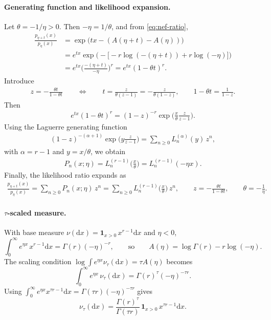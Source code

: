 \documentclass[a4paper,11pt]{article}
\numberwithin{equation}{section}
\theoremstyle{plain}
\theoremstyle{definition}
\theoremstyle{remark}
\newcommand{\1}{\ensuremath{\mathds{1}}\xspace}
\newcommand{\dd}{\ensuremath{{\textrm{d}}}\xspace}
\begin{document}
\paragraph{Generating function and likelihood expansion.}
Let \(\theta=-1/\eta>0\). Then \(-\eta=1/\theta\), and from \eqref{eq:nef-ratio},
\begin{align}
\frac{p_{\eta+t}(x)}{p_\eta(x)}
&=\exp\!\big(t x-(A(\eta+t)-A(\eta))\big)\nonumber\\
&=e^{t x}\exp\!\Big(-\big[-r\log(-(\eta+t))+r\log(-\eta)\big]\Big)\nonumber\\
&=e^{t x}\Big(\frac{-(\eta+t)}{-\eta}\Big)^r
=e^{t x}(1-\theta t)^r .
\end{align}
Introduce
\begin{align}
z=-\frac{\theta t}{1-\theta t}
\qquad\Longleftrightarrow\qquad
t=\frac{z}{\theta(z-1)}=-\frac{z}{\theta(1-z)},
\qquad
1-\theta t=\frac{1}{1-z}.
\end{align}
Then
\begin{align}
e^{t x}(1-\theta t)^r
=(1-z)^{-r}\exp\!\Big(\frac{x}{\theta}\frac{z}{z-1}\Big).
\end{align}
Using the Laguerre generating function
\begin{align}
(1-z)^{-(\alpha+1)}\exp\!\Big(y\frac{z}{z-1}\Big)
=\sum_{n\ge 0}L_n^{(\alpha)}(y)\,z^n,
\end{align}
with \(\alpha=r-1\) and \(y=x/\theta\), we obtain
\begin{align}
P_n(x;\eta)=L_n^{(r-1)}\!\Big(\frac{x}{\theta}\Big)
=L_n^{(r-1)}(-\eta x).
\end{align}
Finally, the likelihood ratio expands as
\begin{align}
\frac{p_{\eta+t}(x)}{p_\eta(x)}
=\sum_{n\ge 0}P_n(x;\eta)\,z^n
=\sum_{n\ge 0}L_n^{(r-1)}\!\Big(\frac{x}{\theta}\Big)\,z^n,
\qquad
z=-\frac{\theta t}{1-\theta t},
\qquad
\theta=-\frac{1}{\eta}.
\end{align}

\paragraph{$\tau$-scaled measure.}
With base measure $\nu(\dd x)=\mathbf{1}_{x>0}\,x^{r-1}\dd x$ and $\eta<0$,
\[
\int_0^\infty e^{\eta x}\,x^{r-1}\dd x=\Gamma(r)(-\eta)^{-r},
\qquad\text{so}\qquad
A(\eta)=\log\Gamma(r)-r\log(-\eta).
\]
The scaling condition $\log\int e^{\eta x}\nu_\tau(\dd x)=\tau A(\eta)$ becomes
\[
\int_0^\infty e^{\eta x}\,\nu_\tau(\dd x)=\Gamma(r)^\tau(-\eta)^{-\tau r}.
\]
Using $\int_0^\infty e^{\eta x}x^{\tau r-1}\dd x=\Gamma(\tau r)(-\eta)^{-\tau r}$ gives
\[
\nu_\tau(\dd x)=\frac{\Gamma(r)^\tau}{\Gamma(\tau r)}\,\mathbf{1}_{x>0}\,x^{\tau r-1}\dd x.
\]
\end{document}

